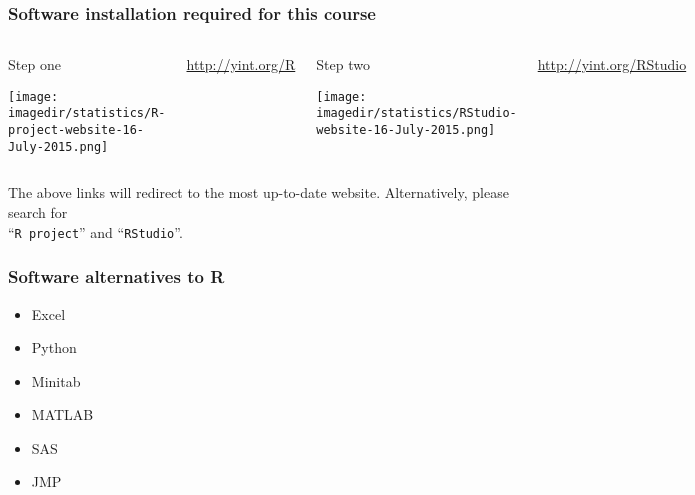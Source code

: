 \begin{frame}\frametitle{Software installation required for this course}
	\begin{columns}[b]
			
			\begin{exampleblock}{\color{red}Step one}
				
				\vspace{10pt}
				\centerline{\texttt{[image: \\imagedir/statistics/R-project-website-16-July-2015.png]}}
			\end{exampleblock}
			
			\vfill
			
			\href{http://yint.org/R}{http://yint.org/R}
		
		
			\begin{exampleblock}{\color{red}Step two}
				\centerline{\texttt{[image: \\imagedir/statistics/RStudio-website-16-July-2015.png]}}
			\end{exampleblock}
			
			\vfill
			\href{http://yint.org/RStudio}{http://yint.org/RStudio}
	\end{columns}
	
	\vspace{6pt}
	\small
	The above links will redirect to the most up-to-date website. Alternatively, please search for\\ ``\texttt{R project}'' and ``\texttt{RStudio}''.
		
\end{frame}

\begin{frame}\frametitle{Software alternatives to R}

	\begin{itemize}
		\item	Excel
		\item	Python
		\item	Minitab
		\item	MATLAB
		\item	SAS
		\item	JMP
	\end{itemize}
\end{frame}

{
\begin{frame}\frametitle{}
\end{frame}}

